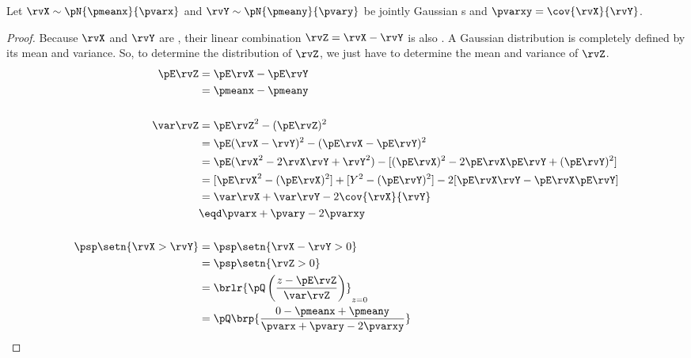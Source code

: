 \begin{proposition}
Let $\rvX\sim\pN{\pmeanx}{\pvarx}$ and $\rvY\sim\pN{\pmeany}{\pvary}$ be
jointly Gaussian s and $\pvarxy=\cov{\rvX}{\rvY}$.
\\
\propbox{
  \psp\setn{\rvX>\rvY} = \pQ\brp{\frac{-\pmeanx + \pmeany}{\pvarx+\pvary-2\pvarxy}}
  }
\end{proposition}
\begin{proof}
Because $\rvX$ and $\rvY$ are ,
their linear combination $\rvZ=\rvX-\rvY$ is also .
A Gaussian distribution is completely defined by its mean and variance.
So, to determine the distribution of $\rvZ$,
we just have to determine the mean and variance of $\rvZ$.
\begin{align*}
  \pE\rvZ
    &= \pE\rvX - \pE\rvY
  \\&= \pmeanx - \pmeany
\\
\\
  \var\rvZ
    &= \pE\rvZ^2 - (\pE\rvZ)^2
  \\&= \pE (\rvX-\rvY)^2 - (\pE\rvX - \pE\rvY)^2
  \\&= \pE (\rvX^2-2\rvX\rvY+\rvY^2) - [(\pE\rvX)^2 -2\pE\rvX \pE\rvY + (\pE\rvY)^2 ]
  \\&= [\pE\rvX^2- (\pE\rvX)^2]  + [Y^2- (\pE\rvY)^2] - 2[\pE\rvX\rvY - \pE\rvX \pE\rvY]
  \\&= \var\rvX + \var\rvY - 2\cov{\rvX}{\rvY}
  \\&\eqd \pvarx + \pvary -2\pvarxy
\\
\\
  \psp\setn{\rvX>\rvY}
    &= \psp\setn{\rvX-\rvY>0}
  \\&= \psp\setn{\rvZ>0}
  \\&= \brlr{\pQ\left(\frac{z-\pE\rvZ}{\var\rvZ} \right)}_{z=0}
  \\&= \pQ\brp{\frac{0-\pmeanx+\pmeany}{\pvarx+\pvary-2\pvarxy}}
\end{align*}
\end{proof}

